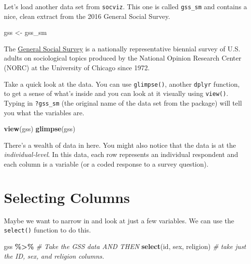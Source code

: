 \documentclass[
]{book}
\newenvironment{Shaded}{\begin{snugshade}}{\end{snugshade}}
\newcommand{\CommentTok}[1]{\textcolor[rgb]{0.56,0.35,0.01}{\textit{#1}}}
\newcommand{\FunctionTok}[1]{\textcolor[rgb]{0.13,0.29,0.53}{\textbf{#1}}}
\newcommand{\NormalTok}[1]{#1}
\newcommand{\OtherTok}[1]{\textcolor[rgb]{0.56,0.35,0.01}{#1}}
\newcommand{\SpecialCharTok}[1]{\textcolor[rgb]{0.81,0.36,0.00}{\textbf{#1}}}
\begin{document}
Let's load another data set from \texttt{socviz}. This one is called \texttt{gss\_sm} and contains a nice, clean extract from the 2016 General Social Survey.

\begin{Shaded}
\begin{Highlighting}[]
\NormalTok{gss }\OtherTok{\textless{}{-}}\NormalTok{ gss\_sm}
\end{Highlighting}
\end{Shaded}

The \href{https://gss.norc.org/}{General Social Survey} is a nationally representative biennial survey of U.S. adults on sociological topics produced by the National Opinion Research Center (NORC) at the University of Chicago since 1972.

Take a quick look at the data. You can use \texttt{glimpse()}, another \texttt{dplyr} function, to get a sense of what's inside and you can look at it visually using \texttt{view()}. Typing in \texttt{?gss\_sm} (the original name of the data set from the package) will tell you what the variables are.

\begin{Shaded}
\begin{Highlighting}[]
\FunctionTok{view}\NormalTok{(gss)}
\FunctionTok{glimpse}\NormalTok{(gss)}
\end{Highlighting}
\end{Shaded}

There's a wealth of data in here. You might also notice that the data is at the \emph{individual-level}. In this data, each row represents an individual respondent and each column is a variable (or a coded response to a survey question).

\hypertarget{selecting-columns}{%
\section{Selecting Columns}\label{selecting-columns}}

Maybe we want to narrow in and look at just a few variables. We can use the \texttt{select()} function to do this.

\begin{Shaded}
\begin{Highlighting}[]
\NormalTok{gss }\SpecialCharTok{\%\textgreater{}\%}                             \CommentTok{\# Take the GSS data AND THEN}
  \FunctionTok{select}\NormalTok{(id, sex, religion)         }\CommentTok{\# take just the ID, sex, and religion columns.}
\end{Highlighting}
\end{Shaded}
\end{document}

